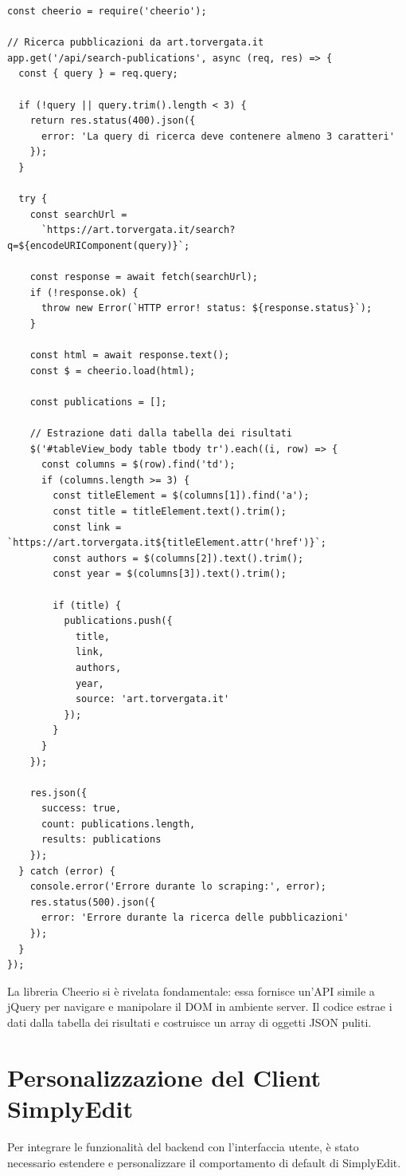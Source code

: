 \begin{verbatim}
const cheerio = require('cheerio');

// Ricerca pubblicazioni da art.torvergata.it
app.get('/api/search-publications', async (req, res) => {
  const { query } = req.query;
  
  if (!query || query.trim().length < 3) {
    return res.status(400).json({ 
      error: 'La query di ricerca deve contenere almeno 3 caratteri' 
    });
  }
  
  try {
    const searchUrl = 
      `https://art.torvergata.it/search?q=${encodeURIComponent(query)}`;
    
    const response = await fetch(searchUrl);
    if (!response.ok) {
      throw new Error(`HTTP error! status: ${response.status}`);
    }
    
    const html = await response.text();
    const $ = cheerio.load(html);

    const publications = [];
    
    // Estrazione dati dalla tabella dei risultati
    $('#tableView_body table tbody tr').each((i, row) => {
      const columns = $(row).find('td');
      if (columns.length >= 3) {
        const titleElement = $(columns[1]).find('a');
        const title = titleElement.text().trim();
        const link = `https://art.torvergata.it${titleElement.attr('href')}`;
        const authors = $(columns[2]).text().trim();
        const year = $(columns[3]).text().trim();
        
        if (title) {
          publications.push({ 
            title, 
            link, 
            authors, 
            year,
            source: 'art.torvergata.it'
          });
        }
      }
    });

    res.json({
      success: true,
      count: publications.length,
      results: publications
    });
  } catch (error) {
    console.error('Errore durante lo scraping:', error);
    res.status(500).json({ 
      error: 'Errore durante la ricerca delle pubblicazioni' 
    });
  }
});
\end{verbatim}

La libreria Cheerio si è rivelata fondamentale: essa fornisce un'API simile a jQuery per navigare e manipolare il DOM in ambiente server. Il codice estrae i dati dalla tabella dei risultati e costruisce un array di oggetti JSON puliti.

\section{Personalizzazione del Client SimplyEdit}
Per integrare le funzionalità del backend con l'interfaccia utente, è stato necessario estendere e personalizzare il comportamento di default di SimplyEdit.

